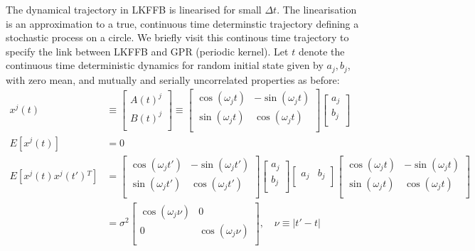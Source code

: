 The dynamical trajectory in LKFFB is linearised for small $\Delta t$.  The linearisation is an approximation to a true, continuous time determinstic trajectory defining a stochastic process on a circle. We briefly visit this continous time trajectory to specify the link between LKFFB and GPR (periodic kernel). Let $t$ denote the continuous time deterministic dynamics for random initial state given by $a_j, b_j$, with zero mean, and mutually and serially uncorrelated properties as before:
\begin{align}
x^j(t) & \equiv \begin{bmatrix} A(t)^j \\ B(t)^j \\ \end{bmatrix} \equiv \begin{bmatrix} \cos(\omega_j t) & -\sin(\omega_j t) \\ \sin(\omega_j t) & \cos(\omega_j t) \\ \end{bmatrix} \begin{bmatrix} a_j \\ b_j \\ \end{bmatrix} \\
E[x^j(t)]&= 0 \\%
E[x^j(t) x^j(t'){}^T]&= \begin{bmatrix} \cos(\omega_j t') & -\sin(\omega_j t') \\ \sin(\omega_jt') & \cos(\omega_jt') \\ \end{bmatrix} \begin{bmatrix} a_j \\ b_j \\ \end{bmatrix} \begin{bmatrix} a_j & b_j \\ \end{bmatrix} \begin{bmatrix} \cos(\omega_j t) & -\sin(\omega_j t) \\ \sin(\omega_j t) & \cos(\omega_j t) \\ \end{bmatrix} \\ 
&=\sigma^2 \begin{bmatrix} 
\cos(\omega_j\nu) & 0 \\ 
0 & \cos(\omega_j\nu)  \\
\end{bmatrix}, \quad \nu \equiv |t'-t| \label{eqn:cov_circle}
\end{align}
